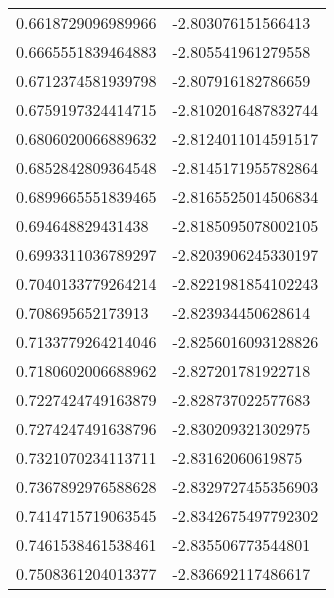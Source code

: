 \begin{supertabular}{ll}
0.6618729096989966  & -2.803076151566413   \\
0.6665551839464883  & -2.805541961279558   \\
0.6712374581939798  & -2.807916182786659   \\
0.6759197324414715  & -2.8102016487832744  \\
0.6806020066889632  & -2.8124011014591517  \\
0.6852842809364548  & -2.8145171955782864  \\
0.6899665551839465  & -2.8165525014506834  \\
0.694648829431438   & -2.8185095078002105  \\
0.6993311036789297  & -2.8203906245330197  \\
0.7040133779264214  & -2.8221981854102243  \\
0.708695652173913   & -2.823934450628614   \\
0.7133779264214046  & -2.8256016093128826  \\
0.7180602006688962  & -2.827201781922718   \\
0.7227424749163879  & -2.828737022577683   \\
0.7274247491638796  & -2.830209321302975   \\
0.7321070234113711  & -2.83162060619875    \\
0.7367892976588628  & -2.8329727455356903  \\
0.7414715719063545  & -2.8342675497792302  \\
0.7461538461538461  & -2.835506773544801   \\
0.7508361204013377  & -2.836692117486617   \\
\end{supertabular}
